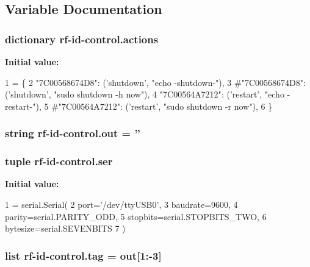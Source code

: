 \subsection{Variable Documentation}
\hypertarget{namespacerf-id-control_a44ce566fe9439db91445bbacc055dfba}{
\subsubsection[{actions}]{\setlength{\rightskip}{0pt plus 5cm}dictionary rf-\/id-\/control.\-actions}}\label{namespacerf-id-control_a44ce566fe9439db91445bbacc055dfba}
{\bfseries Initial value\-:}
\begin{DoxyCode}
1 = \{
2     \textcolor{stringliteral}{"7C00568674D8"}: (\textcolor{stringliteral}{'shutdown'}, \textcolor{stringliteral}{"echo -shutdown-"}),
3     \textcolor{comment}{#"7C00568674D8": ('shutdown', "sudo shutdown -h now"),}
4     \textcolor{stringliteral}{"7C00564A7212"}: (\textcolor{stringliteral}{'restart'}, \textcolor{stringliteral}{"echo -restart-"}),
5     \textcolor{comment}{#"7C00564A7212": ('restart', "sudo shutdown -r now"),}
6 \}
\end{DoxyCode}
\hypertarget{namespacerf-id-control_a340302d5b6d011871e45b3b847dab3a6}{
\subsubsection[{out}]{\setlength{\rightskip}{0pt plus 5cm}string rf-\/id-\/control.\-out = ''}}\label{namespacerf-id-control_a340302d5b6d011871e45b3b847dab3a6}
\hypertarget{namespacerf-id-control_ad75e60402f9b3cb86ddbce12f4c99256}{
\subsubsection[{ser}]{\setlength{\rightskip}{0pt plus 5cm}tuple rf-\/id-\/control.\-ser}}\label{namespacerf-id-control_ad75e60402f9b3cb86ddbce12f4c99256}
{\bfseries Initial value\-:}
\begin{DoxyCode}
1 = serial.Serial(
2     port=\textcolor{stringliteral}{'/dev/ttyUSB0'},
3     baudrate=9600,
4     parity=serial.PARITY\_ODD,
5     stopbits=serial.STOPBITS\_TWO,
6     bytesize=serial.SEVENBITS
7 )
\end{DoxyCode}
\hypertarget{namespacerf-id-control_a10a094d39156477476efd89f406dae97}{
\subsubsection[{tag}]{\setlength{\rightskip}{0pt plus 5cm}list rf-\/id-\/control.\-tag = {\bf out}\mbox{[}1\-:-\/3\mbox{]}}}\label{namespacerf-id-control_a10a094d39156477476efd89f406dae97}
